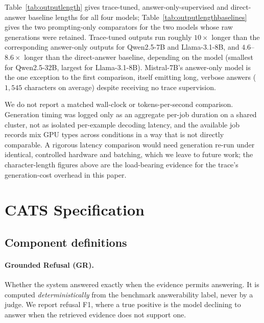 \begin{table}[htbp]\centering

\caption{\textbf{Output length for the two prompting-only comparators}, characters over the 736-example benchmark. Llama-3.1-8B and Qwen2.5-32B are omitted: only reformatted, not raw, generations were retained for their prompting-only runs.}
\label{tab:outputlengthbaselines}
\end{table}

Table~\ref{tab:outputlength} gives trace-tuned, answer-only-supervised and
direct-answer baseline lengths for all four models; Table~\ref{tab:outputlengthbaselines}
gives the two prompting-only comparators for the two models whose raw
generations were retained. Trace-tuned outputs run roughly $10\times$ longer
than the corresponding answer-only outputs for Qwen2.5-7B and Llama-3.1-8B,
and $4.6$--$8.6\times$ longer than the direct-answer baseline, depending on
the model (smallest for Qwen2.5-32B, largest for Llama-3.1-8B). Mistral-7B's
answer-only model is the one exception to the first comparison, itself
emitting long, verbose answers ($1{,}545$ characters on average) despite
receiving no trace supervision.

We do not report a matched wall-clock or tokens-per-second comparison.
Generation timing was logged only as an aggregate per-job duration on a
shared cluster, not as isolated per-example decoding latency, and the
available job records mix GPU types across conditions in a way that is not
directly comparable. A rigorous latency comparison would need generation
re-run under identical, controlled hardware and batching, which we leave to
future work; the character-length figures above are the load-bearing evidence
for the trace's generation-cost overhead in this paper.

\section{CATS Specification}
\label{app:cats}

\subsection{Component definitions}

\paragraph{Grounded Refusal (GR).} Whether the system answered exactly when the
evidence permits answering. It is computed \emph{deterministically} from the
benchmark answerability label, never by a judge. We report refusal F1, where a
true positive is the model declining to answer when the retrieved evidence does
not support one.

